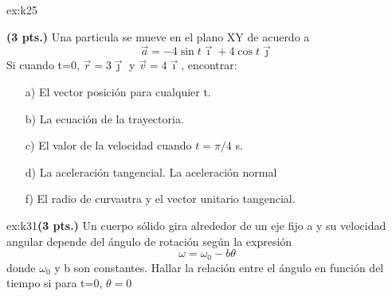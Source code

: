 \begin{multicols}{2}
     \begin{excercise}[][][]{ex:k25}{\textbf{(3 pts.)}
         Una particula se mueve en el plano XY de acuerdo a 
        \begin{equation*}
                \vec{a}=-4\sin t\vec{\imath}+4\cos t\vec{\jmath}
            \end{equation*}
            Si cuando t=0, $\vec{r}=3\vec{\jmath}$ y $\vec{v}=4\vec{\imath}$, encontrar:
        \begin{itemize}
            \item[a)] El vector posición para cualquier t.
            \item[b)] La ecuación de la trayectoria.
            \item[c)] El valor de la velocidad cuando $t=\pi/4$ s.
            \item[d)] La aceleración tangencial.  La aceleración normal
            \item[f)] El radio de curvautra y el vector unitario tangencial.
        \end{itemize}
         }
    \end{excercise}
    \begin{excercise}[][][ $\theta(t)=\frac{\omega_0}{b}(1-e^{-bt})$;]{ex:k31}{\textbf{(3 pts.)}
        Un cuerpo sólido gira alrededor de un eje fijo a y su velocidad angular depende del ángulo de rotación según la expresión 
        \begin{equation*}
            \omega=\omega_0-b\theta 
        \end{equation*}
        donde $\omega_0$ y b son constantes. Hallar la relación entre el ángulo en función del tiempo si para t=0, $\theta=0$
        }
    \end{excercise}



\end{multicols}
